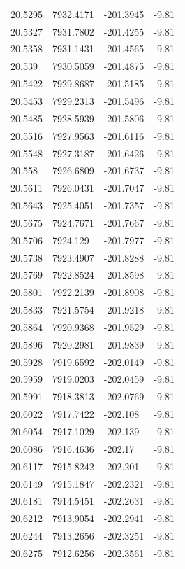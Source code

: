 \begin{table}[H]
\begin{tabular}{llll}
20.5295 & 7932.4171 & -201.3945 & -9.81 \\
20.5327 & 7931.7802 & -201.4255 & -9.81 \\
20.5358 & 7931.1431 & -201.4565 & -9.81 \\
20.539 & 7930.5059 & -201.4875 & -9.81 \\
20.5422 & 7929.8687 & -201.5185 & -9.81 \\
20.5453 & 7929.2313 & -201.5496 & -9.81 \\
20.5485 & 7928.5939 & -201.5806 & -9.81 \\
20.5516 & 7927.9563 & -201.6116 & -9.81 \\
20.5548 & 7927.3187 & -201.6426 & -9.81 \\
20.558 & 7926.6809 & -201.6737 & -9.81 \\
20.5611 & 7926.0431 & -201.7047 & -9.81 \\
20.5643 & 7925.4051 & -201.7357 & -9.81 \\
20.5675 & 7924.7671 & -201.7667 & -9.81 \\
20.5706 & 7924.129 & -201.7977 & -9.81 \\
20.5738 & 7923.4907 & -201.8288 & -9.81 \\
20.5769 & 7922.8524 & -201.8598 & -9.81 \\
20.5801 & 7922.2139 & -201.8908 & -9.81 \\
20.5833 & 7921.5754 & -201.9218 & -9.81 \\
20.5864 & 7920.9368 & -201.9529 & -9.81 \\
20.5896 & 7920.2981 & -201.9839 & -9.81 \\
20.5928 & 7919.6592 & -202.0149 & -9.81 \\
20.5959 & 7919.0203 & -202.0459 & -9.81 \\
20.5991 & 7918.3813 & -202.0769 & -9.81 \\
20.6022 & 7917.7422 & -202.108 & -9.81 \\
20.6054 & 7917.1029 & -202.139 & -9.81 \\
20.6086 & 7916.4636 & -202.17 & -9.81 \\
20.6117 & 7915.8242 & -202.201 & -9.81 \\
20.6149 & 7915.1847 & -202.2321 & -9.81 \\
20.6181 & 7914.5451 & -202.2631 & -9.81 \\
20.6212 & 7913.9054 & -202.2941 & -9.81 \\
20.6244 & 7913.2656 & -202.3251 & -9.81 \\
20.6275 & 7912.6256 & -202.3561 & -9.81 \\

\end{tabular}
\end{table}
